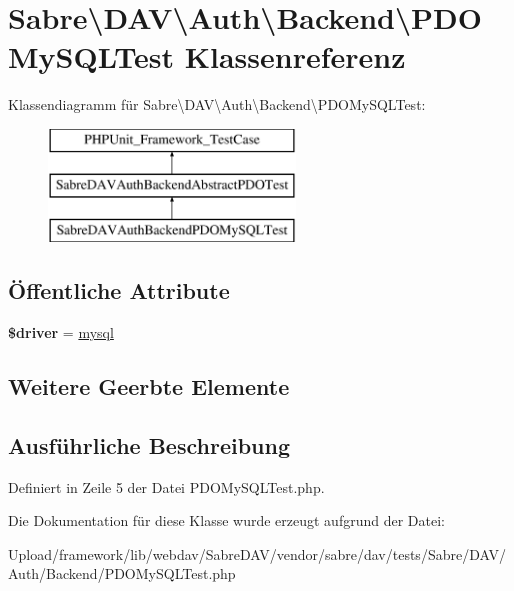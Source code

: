 \hypertarget{class_sabre_1_1_d_a_v_1_1_auth_1_1_backend_1_1_p_d_o_my_s_q_l_test}{}\section{Sabre\textbackslash{}D\+AV\textbackslash{}Auth\textbackslash{}Backend\textbackslash{}P\+D\+O\+My\+S\+Q\+L\+Test Klassenreferenz}
\label{class_sabre_1_1_d_a_v_1_1_auth_1_1_backend_1_1_p_d_o_my_s_q_l_test}
Klassendiagramm für Sabre\textbackslash{}D\+AV\textbackslash{}Auth\textbackslash{}Backend\textbackslash{}P\+D\+O\+My\+S\+Q\+L\+Test\+:\begin{figure}[H]
\begin{center}
\leavevmode
\includegraphics[height=3.000000cm]{class_sabre_1_1_d_a_v_1_1_auth_1_1_backend_1_1_p_d_o_my_s_q_l_test}
\end{center}
\end{figure}
\subsection*{Öffentliche Attribute}
\begin{DoxyCompactItemize}
\item 
\mbox{\label{class_sabre_1_1_d_a_v_1_1_auth_1_1_backend_1_1_p_d_o_my_s_q_l_test_a78ea29f0ebf743b5b06a7435498cb463}} 
{\bfseries \$driver} = \textquotesingle{}\mbox{\hyperlink{classmysql}{mysql}}\textquotesingle{}
\end{DoxyCompactItemize}
\subsection*{Weitere Geerbte Elemente}


\subsection{Ausführliche Beschreibung}


Definiert in Zeile 5 der Datei P\+D\+O\+My\+S\+Q\+L\+Test.\+php.



Die Dokumentation für diese Klasse wurde erzeugt aufgrund der Datei\+:\begin{DoxyCompactItemize}
\item 
Upload/framework/lib/webdav/\+Sabre\+D\+A\+V/vendor/sabre/dav/tests/\+Sabre/\+D\+A\+V/\+Auth/\+Backend/P\+D\+O\+My\+S\+Q\+L\+Test.\+php\end{DoxyCompactItemize}
